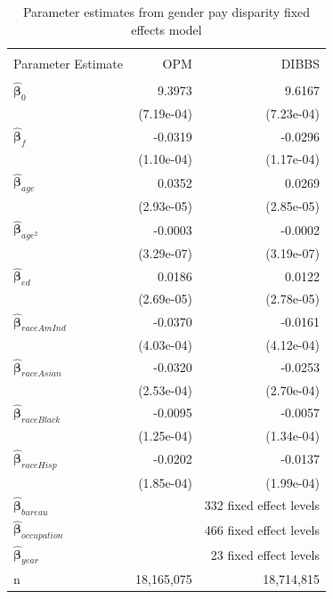 \documentclass[10pt, letterpaper]{article}
\newcommand{\mest}[1]{\hat{\bm{#1}}}
\begin{document}
\begin{spacing}{1.0}
\begin{table}[h]
    \centering
    \caption{Parameter estimates from gender pay disparity fixed effects model}
    \label{table:GenderPayOLS}
    \begin{tabular}{lrr}
        \hline\\[-10pt]
        Parameter Estimate & OPM & DIBBS \\ 
        \hline\\[-6pt]
        \hspace{10pt} $\mest{\beta}_0$ & 9.3973 & 9.6167 \\ 
        & (7.19e-04) & (7.23e-04) \\ 
        \hspace{10pt} $\mest{\beta}_f$ & -0.0319 & -0.0296 \\ 
        & (1.10e-04) & (1.17e-04) \\ 
        \hspace{10pt} $\mest{\beta}_{age}$ & 0.0352 & 0.0269 \\ 
        & (2.93e-05) & (2.85e-05) \\ 
        \hspace{10pt} $\mest{\beta}_{age^2}$ & -0.0003 & -0.0002 \\ 
        & (3.29e-07) & (3.19e-07) \\ 
        \hspace{10pt} $\mest{\beta}_{ed}$ & 0.0186 & 0.0122 \\ 
        & (2.69e-05) & (2.78e-05) \\ 
        \hspace{10pt} $\mest{\beta}_{raceAmInd}$ & -0.0370 & -0.0161 \\ 
        & (4.03e-04) & (4.12e-04) \\ 
        \hspace{10pt} $\mest{\beta}_{raceAsian}$ & -0.0320 & -0.0253 \\ 
        & (2.53e-04) & (2.70e-04) \\ 
        \hspace{10pt} $\mest{\beta}_{raceBlack}$ & -0.0095 & -0.0057 \\ 
        & (1.25e-04) & (1.34e-04) \\ 
        \hspace{10pt} $\mest{\beta}_{raceHisp}$ & -0.0202 & -0.0137 \\ 
        & (1.85e-04) & (1.99e-04) \\ 
        \hspace{10pt} $\mest{\beta}_{bureau}$ & & 332 fixed effect levels \\ 
        \hspace{10pt} $\mest{\beta}_{occupation}$ & & 466 fixed effect levels \\ 
        \hspace{10pt} $\mest{\beta}_{year}$ & & 23 fixed effect levels \\
        \hspace{10pt} n & 18,165,075 & 18,714,815 \\[4pt]
        \hline
    \end{tabular}
\end{table}


\end{spacing}
\end{document}
